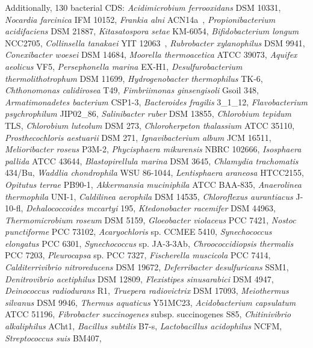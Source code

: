 Additionally, 130 bacterial CDS:
\textit{Acidimicrobium ferrooxidans} DSM 10331,
\textit{Nocardia farcinica} IFM 10152,
\textit{Frankia alni} ACN14a ,
\textit{Propionibacterium acidifaciens} DSM 21887,
\textit{Kitasatospora setae} KM-6054,
\textit{Bifidobacterium longum} NCC2705,
\textit{Collinsella tanakaei} YIT 12063 ,
\textit{Rubrobacter xylanophilus} DSM 9941,
\textit{Conexibacter woesei} DSM 14684,
\textit{Moorella thermoacetica} ATCC 39073,
\textit{Aquifex aeolicus} VF5,
\textit{Persephonella marina} EX-H1,
\textit{Desulfurobacterium thermolithotrophum} DSM 11699,
\textit{Hydrogenobacter thermophilus} TK-6,
\textit{Chthonomonas calidirosea} T49,
\textit{Fimbriimonas ginsengisoli} Gsoil 348,
\textit{Armatimonadetes bacterium} CSP1-3,
\textit{Bacteroides fragilis} 3\_1\_12,
\textit{Flavobacterium psychrophilum} JIP02\_86,
\textit{Salinibacter ruber} DSM 13855,
\textit{Chlorobium tepidum} TLS,
\textit{Chlorobium luteolum} DSM 273,
\textit{Chloroherpeton thalassium} ATCC 35110,
\textit{Prosthecochloris aestuarii} DSM 271,
\textit{Ignavibacterium album} JCM 16511,
\textit{Melioribacter roseus} P3M-2,
\textit{Phycisphaera mikurensis} NBRC 102666,
\textit{Isosphaera pallida} ATCC 43644,
\textit{Blastopirellula marina} DSM 3645,
\textit{Chlamydia trachomatis} 434/Bu,
\textit{Waddlia chondrophila} WSU 86-1044,
\textit{Lentisphaera araneosa} HTCC2155,
\textit{Opitutus terrae} PB90-1,
\textit{Akkermansia muciniphila} ATCC BAA-835,
\textit{Anaerolinea thermophila} UNI-1,
\textit{Caldilinea aerophila} DSM 14535,
\textit{Chloroflexus aurantiacus} J-10-fl,
\textit{Dehalococcoides mccartyi} 195,
\textit{Ktedonobacter racemifer} DSM 44963,
\textit{Thermomicrobium roseum} DSM 5159,
\textit{Gloeobacter violaceus} PCC 7421,
\textit{Nostoc punctiforme} PCC 73102,
\textit{Acaryochloris} sp. CCMEE 5410,
\textit{Synechococcus elongatus} PCC 6301,
\textit{Synechococcus} sp. JA-3-3Ab,
\textit{Chroococcidiopsis thermalis} PCC 7203,
\textit{Pleurocapsa} sp. PCC 7327,
\textit{Fischerella muscicola} PCC 7414,
\textit{Calditerrivibrio nitroreducens} DSM 19672,
\textit{Deferribacter desulfuricans} SSM1,
\textit{Denitrovibrio acetiphilus} DSM 12809,
\textit{Flexistipes sinusarabici} DSM 4947,
\textit{Deinococcus radiodurans} R1,
\textit{Truepera radiovictrix} DSM 17093,
\textit{Meiothermus silvanus} DSM 9946,
\textit{Thermus aquaticus} Y51MC23,
\textit{Acidobacterium capsulatum} ATCC 51196,
\textit{Fibrobacter succinogenes} subsp. succinogenes S85,
\textit{Chitinivibrio alkaliphilus} ACht1,
\textit{Bacillus subtilis} B7-s,
\textit{Lactobacillus acidophilus} NCFM,
\textit{Streptococcus suis} BM407,
